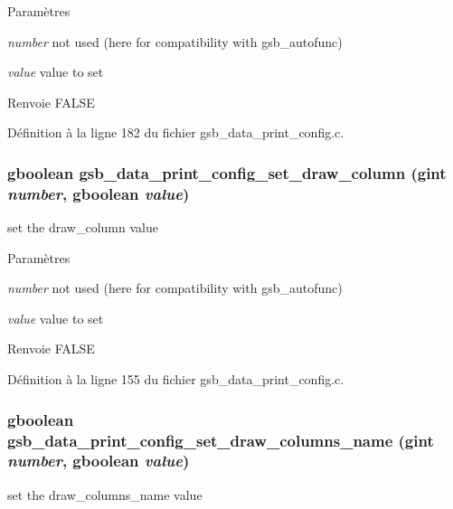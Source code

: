 \begin{DoxyParams}{Paramètres}
\item[{\em number}]not used (here for compatibility with gsb\_\-autofunc) \item[{\em value}]value to set\end{DoxyParams}
\begin{DoxyReturn}{Renvoie}
FALSE 
\end{DoxyReturn}


Définition à la ligne 182 du fichier gsb\_\-data\_\-print\_\-config.c.

\subsubsection[{gsb\_\-data\_\-print\_\-config\_\-set\_\-draw\_\-column}]{\setlength{\rightskip}{0pt plus 5cm}gboolean gsb\_\-data\_\-print\_\-config\_\-set\_\-draw\_\-column (gint {\em number}, \/  gboolean {\em value})}\label{gsb__data__print__config_8h_aa24596906e01248f337b10c9ef207a66}
set the draw\_\-column value


\begin{DoxyParams}{Paramètres}
\item[{\em number}]not used (here for compatibility with gsb\_\-autofunc) \item[{\em value}]value to set\end{DoxyParams}
\begin{DoxyReturn}{Renvoie}
FALSE 
\end{DoxyReturn}


Définition à la ligne 155 du fichier gsb\_\-data\_\-print\_\-config.c.

\subsubsection[{gsb\_\-data\_\-print\_\-config\_\-set\_\-draw\_\-columns\_\-name}]{\setlength{\rightskip}{0pt plus 5cm}gboolean gsb\_\-data\_\-print\_\-config\_\-set\_\-draw\_\-columns\_\-name (gint {\em number}, \/  gboolean {\em value})}\label{gsb__data__print__config_8h_a59f35cc5d8bddd66c4c302f32820b4b9}
set the draw\_\-columns\_\-name value


